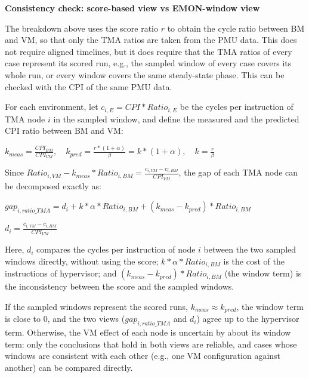 \documentclass[12pt]{article}
\newcommand{\npar}[1]{#1\par}
\newcommand{\dmath}[1]{{\centering $\displaystyle #1$\par}}
\newcommand{\emptypar}{\mbox{}\par}
\newcommand{\numpara}[4]{{\hangindent=#1\relax\hangafter=1\relax
  \noindent\hspace*{\dimexpr#1-#2\relax}\makebox[#2][l]{#3}#4\par}}
\begin{document}
\emptypar
\numpara{18.00pt}{18.00pt}{\textbf{(5)}}{\textbf{Consistency check: score-based view vs EMON-window view}}
\npar{\hspace*{4\fontdimen2\font}The breakdown above uses the score ratio $\mathit{r}$ to obtain the cycle ratio between BM and VM, so that only the TMA ratios are taken from the PMU data. This does not require aligned timelines, but it does require that the TMA ratios of every case represent its scored run, e.g., the sampled window of every case covers its whole run, or every window covers the same steady-state phase. This can be checked with the CPI of the same PMU data.}
\npar{\hspace*{4\fontdimen2\font}For each environment, let ${\mathit{c}}_{\mathit{i},\mathit{E}}=\mathit{CPI}*{\mathit{Ratio}}_{\mathit{i},\mathit{E}}$ be the cycles per instruction of TMA node $\mathit{i}$ in the sampled window, and define the measured and the predicted CPI ratio between BM and VM:}
\dmath{{\mathit{k}}_{\mathit{meas}}=\frac{{\mathit{CPI}}_{\mathit{BM}}}{{\mathit{CPI}}_{\mathit{VM}}},\quad {\mathit{k}}_{\mathit{pred}}=\frac{\mathit{r}*\left( 1+\alpha  \right)}{\beta }=\mathit{k}*\left( 1+\alpha  \right),\quad \mathit{k}=\frac{\mathit{r}}{\beta }}
\npar{\hspace*{4\fontdimen2\font}Since ${\mathit{Ratio}}_{\mathit{i},\mathit{VM}}-{\mathit{k}}_{\mathit{meas}}*{\mathit{Ratio}}_{\mathit{i},\mathit{BM}}=\frac{{\mathit{c}}_{\mathit{i},\mathit{VM}}-{\mathit{c}}_{\mathit{i},\mathit{BM}}}{{\mathit{CPI}}_{\mathit{VM}}}$, the gap of each TMA node can be decomposed exactly as:}
\dmath{{\mathit{gap}}_{\mathit{i},\mathit{ratio\_TMA}}={\mathit{d}}_{\mathit{i}}+\mathit{k}*\alpha *{\mathit{Ratio}}_{\mathit{i},\mathit{BM}}+\left( {\mathit{k}}_{\mathit{meas}}-{\mathit{k}}_{\mathit{pred}} \right)*{\mathit{Ratio}}_{\mathit{i},\mathit{BM}}}
\dmath{{\mathit{d}}_{\mathit{i}}=\frac{{\mathit{c}}_{\mathit{i},\mathit{VM}}-{\mathit{c}}_{\mathit{i},\mathit{BM}}}{{\mathit{CPI}}_{\mathit{VM}}}}
\npar{\hspace*{4\fontdimen2\font}Here, ${\mathit{d}}_{\mathit{i}}$ compares the cycles per instruction of node $\mathit{i}$ between the two sampled windows directly, without using the score; $\mathit{k}*\alpha *{\mathit{Ratio}}_{\mathit{i},\mathit{BM}}$ is the cost of the instructions of hypervisor; and $\left( {\mathit{k}}_{\mathit{meas}}-{\mathit{k}}_{\mathit{pred}} \right)*{\mathit{Ratio}}_{\mathit{i},\mathit{BM}}$ (the window term) is the inconsistency between the score and the sampled windows.}
\npar{\hspace*{4\fontdimen2\font}If the sampled windows represent the scored runs, ${\mathit{k}}_{\mathit{meas}}\approx {\mathit{k}}_{\mathit{pred}}$, the window term is close to 0, and the two views (${\mathit{gap}}_{\mathit{i},\mathit{ratio\_TMA}}$ and ${\mathit{d}}_{\mathit{i}}$) agree up to the hypervisor term. Otherwise, the VM effect of each node is uncertain by about its window term: only the conclusions that hold in both views are reliable, and cases whose windows are consistent with each other (e.g., one VM configuration against another) can be compared directly.}
\end{document}
